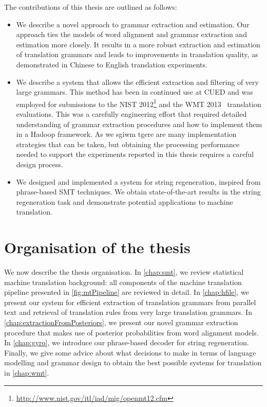 The contributions of this thesis are outlined as follows:
%
\begin{itemize}
  \item We describe a novel approach to grammar extraction
    and estimation. Our approach ties the models of word
    alignment and grammar extraction and estimation more
    closely. It results in a more robust extraction and estimation
    of translation grammars and leads to improvements in
    translation quality, as demonstrated in Chinese to English
    translation experiments.
  \item We describe a system that
    allows the efficient extraction
    and filtering of very large grammars.
    This method has been in continued use at
    CUED and was employed for submissions to
    the NIST 2012\footnote{\url{http://www.nist.gov/itl/iad/mig/openmt12.cfm}}
    and the WMT
    2013~\citep{bojar-buck-callisonburch-federmann-haddow-koehn-monz-post-soricut-specia:2013:WMT} translation
    evaluations. This was a carefully engineering effort
    that required detailed understanding of grammar
    extraction procedures and how to implement them in a
    Hadoop framework. As we sgiwm tgere are many implementation
    strategies that can be taken, but obtaining the processing
    performance needed to support the experiments
    reported in this thesis requires a careful design process.
  \item We designed and implemented a system
    for string regeneration, inspired from
    phrase-based SMT techniques. We obtain
    state-of-the-art results in the string
    regeneration task and demonstrate potential
    applications to machine translation.
\end{itemize}

\section{Organisation of the thesis}

We now describe the thesis organisation.
In \autoref{chap:smt}, we review statistical
machine translation background: all components
of the machine translation pipeline presented in \autoref{fig:mtPipeline}
are reviewed in detail.
In \autoref{chap:hfile}, we present our system for efficient
extraction of translation grammars from parallel
text and retrieval of translation rules
from very large translation grammars.
In \autoref{chap:extractionFromPosteriors}, we
present our novel grammar extraction procedure that makes use of
posterior probabilities from word alignment models.
In \autoref{chap:gyro}, we introduce our phrase-based decoder
for string regeneration. Finally, we give some advice
about what decisions to make in terms of language modelling
and grammar design to obtain the best possible systems
for translation in \autoref{chap:wmt}.
